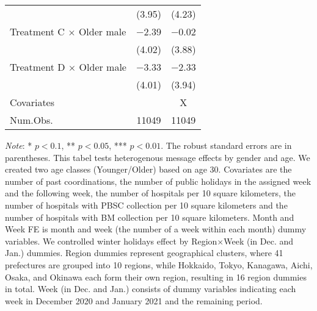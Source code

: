 \documentclass[12pt, a4paper]{article}
\begin{document}
\begin{table}[H]
\begin{threeparttable}
\begin{tabular}[t]{lcc}
 & (\num{3.95}) & (\num{4.23})\\
Treatment C $\times$ Older male & \num{-2.39} & \num{-0.02}\\
 & (\num{4.02}) & (\num{3.88})\\
Treatment D $\times$ Older male & \num{-3.33} & \num{-2.33}\\
 & (\num{4.01}) & (\num{3.94})\\
\midrule
Covariates &  & X\\
Num.Obs. & \num{11049} & \num{11049}\\
\bottomrule
\end{tabular}
\begin{tablenotes}
\item \emph{Note}: * $p < 0.1$, ** $p < 0.05$, *** $p < 0.01$. The robust standard errors are in parentheses. This tabel tests heterogenous message effects by gender and age. We created two age classes (Younger/Older) based on age 30. Covariates are the number of past coordinations, the number of public holidays in the assigned week and the following week, the number of hospitals per 10 square kilometers, the number of hospitals with PBSC collection per 10 square kilometers and the number of hospitals with BM collection per 10 square kilometers. Month and Week FE is month and week (the number of a week within each month) dummy variables. We controlled winter holidays effect by Region$\times$Week (in Dec. and Jan.) dummies. Region dummies represent geographical clusters, where 41 prefectures are grouped into 10 regions, while Hokkaido, Tokyo, Kanagawa, Aichi, Osaka, and Okinawa each form their own region, resulting in 16 region dummies in total. Week (in Dec. and Jan.) consists of dummy variables indicating each week in December 2020 and January 2021 and the remaining period.
\end{tablenotes}
\end{threeparttable}
\end{table}
\end{document}
